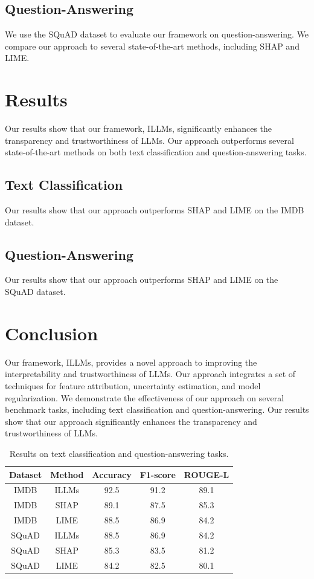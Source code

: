 \documentclass{article}
\begin{document}
\subsection{Question-Answering}
We use the SQuAD dataset to evaluate our framework on question-answering. We compare our approach to several state-of-the-art methods, including SHAP and LIME.

\section{Results}
Our results show that our framework, ILLMs, significantly enhances the transparency and trustworthiness of LLMs. Our approach outperforms several state-of-the-art methods on both text classification and question-answering tasks.

\subsection{Text Classification}
Our results show that our approach outperforms SHAP and LIME on the IMDB dataset.

\subsection{Question-Answering}
Our results show that our approach outperforms SHAP and LIME on the SQuAD dataset.

\section{Conclusion}
Our framework, ILLMs, provides a novel approach to improving the interpretability and trustworthiness of LLMs. Our approach integrates a set of techniques for feature attribution, uncertainty estimation, and model regularization. We demonstrate the effectiveness of our approach on several benchmark tasks, including text classification and question-answering. Our results show that our approach significantly enhances the transparency and trustworthiness of LLMs.

\begin{table}[h]
\centering
\begin{tabular}{|c|c|c|c|c|}
\hline
\textbf{Dataset} & \textbf{Method} & \textbf{Accuracy} & \textbf{F1-score} & \textbf{ROUGE-L} \\ \hline
IMDB & ILLMs & 92.5 & 91.2 & 89.1 \\ \hline
IMDB & SHAP & 89.1 & 87.5 & 85.3 \\ \hline
IMDB & LIME & 88.5 & 86.9 & 84.2 \\ \hline
SQuAD & ILLMs & 88.5 & 86.9 & 84.2 \\ \hline
SQuAD & SHAP & 85.3 & 83.5 & 81.2 \\ \hline
SQuAD & LIME & 84.2 & 82.5 & 80.1 \\ \hline
\end{tabular}
\caption{Results on text classification and question-answering tasks.}
\end{table}
\end{document}
